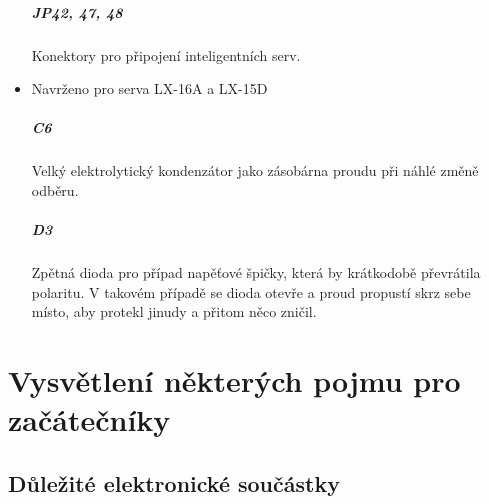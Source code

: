 \documentclass{template/socthesis}
\begin{document}
\begin{itemize}
	\subsubsection*{JP42, 47, 48}
	Konektory pro připojení inteligentních serv.
	\item Navrženo pro serva LX-16A a LX-15D
	
	\subsubsection*{C6}
	Velký elektrolytický kondenzátor jako zásobárna proudu při náhlé změně odběru.
		
	\subsubsection*{D3}
	Zpětná dioda pro případ napěťové špičky, která by krátkodobě převrátila polaritu. V takovém případě se dioda otevře a proud propustí skrz sebe místo, aby protekl jinudy a přitom něco zničil.
	
	\end{itemize}


	\part*{Vysvětlení některých pojmu pro začátečníky}
	
	\chapter*{Důležité elektronické součástky}
\end{document}

